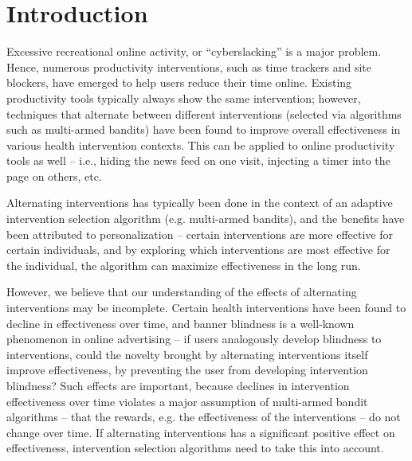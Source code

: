 
\section{Introduction}

Excessive recreational online activity, or ``cyberslacking'' is a major problem. Hence, numerous productivity interventions, such as time trackers and site blockers, have emerged to help users reduce their time online. Existing productivity tools typically always show the same intervention; however, techniques that alternate between different interventions (selected via algorithms such as multi-armed bandits) have been found to improve overall effectiveness in various health intervention contexts. This can be applied to online productivity tools as well -- i.e., hiding the news feed on one visit, injecting a timer into the page on others, etc.

Alternating interventions has typically been done in the context of an adaptive intervention selection algorithm (e.g. multi-armed bandits), and the benefits have been attributed to personalization -- certain interventions are more effective for certain individuals, and by exploring which interventions are most effective for the individual, the algorithm can maximize effectiveness in the long run. 

However, we believe that our understanding of the effects of alternating interventions may be incomplete. Certain health interventions have been found to decline in effectiveness over time, and banner blindness is a well-known phenomenon in online advertising -- if users analogously develop blindness to interventions, could the novelty brought by alternating interventions itself improve effectiveness, by preventing the user from developing intervention blindness? Such effects are important, because declines in intervention effectiveness over time violates a major assumption of multi-armed bandit algorithms -- that the rewards, e.g. the effectiveness of the interventions -- do not change over time. If alternating interventions has a significant positive effect on effectiveness, intervention selection algorithms need to take this into account.

